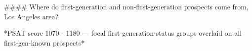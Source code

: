 #### Where do first-generation and non-first-generation prospects come from, Los Angeles area?

*PSAT score 1070 - 1180 — focal first-generation-status groups overlaid on all first-gen-known prospects*
